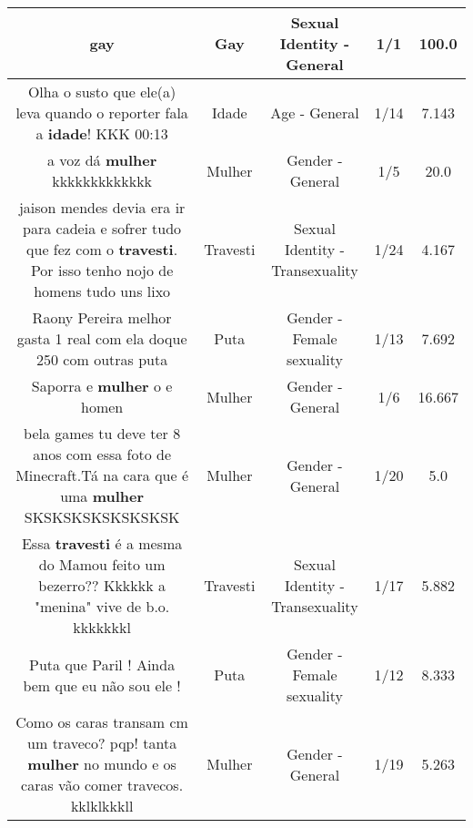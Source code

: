 \documentclass[11pt]{article}
\newlength\mylength
\begin{document}
\begin{center}
\begin{longtable}{|C{.65\mylength}|C{.30\mylength}|C{.12\mylength}|C{.12\mylength}|C{.12\mylength}|}
  \small gay\normalsize   & Gay & Sexual Identity - General & 1/1 & 100.0 \\  \hline
  \small Olha o susto que ele(a) leva quando o reporter fala a \textbf{idade}! KKK 00:13\normalsize   & Idade & Age - General & 1/14 & 7.143 \\  \hline
  \small a voz dá \textbf{mulher} kkkkkkkkkkkkk\normalsize   & Mulher & Gender - General & 1/5 & 20.0 \\  \hline
  \small jaison mendes devia era ir para cadeia e sofrer tudo que fez com o \textbf{travesti}. Por isso tenho nojo de homens tudo uns lixo\normalsize   & Travesti & Sexual Identity - Transexuality & 1/24 & 4.167 \\  \hline
  \small Raony Pereira melhor gasta 1 real com ela doque 250 com outras puta\normalsize   & Puta & Gender - Female sexuality & 1/13 & 7.692 \\  \hline
  \small Saporra e \textbf{mulher} o e homen\normalsize   & Mulher & Gender - General & 1/6 & 16.667 \\  \hline
  \small bela games tu deve ter 8 anos com essa foto de Minecraft.Tá na cara que é uma \textbf{mulher} SKSKSKSKSKSKSKSK\normalsize   & Mulher & Gender - General & 1/20 & 5.0 \\  \hline
  \small Essa \textbf{travesti} é a mesma do Mamou feito um bezerro?? Kkkkkk a "menina" vive de b.o. kkkkkkkl\normalsize   & Travesti & Sexual Identity - Transexuality & 1/17 & 5.882 \\  \hline
  \small Puta que Paril ! Ainda bem que eu não sou ele !\normalsize   & Puta & Gender - Female sexuality & 1/12 & 8.333 \\  \hline
  \small Como os caras transam cm um traveco? pqp! tanta \textbf{mulher} no mundo e os caras vão comer travecos. kklklkkkll\normalsize   & Mulher & Gender - General & 1/19 & 5.263 \\  \hline

\end{longtable}
\end{center}
\end{document}

